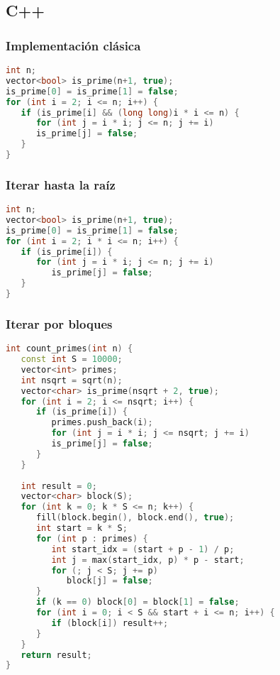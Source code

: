 \subsection{C++}

\subsubsection{Implementación clásica}
\begin{lstlisting}[language=C++]
int n;
vector<bool> is_prime(n+1, true);
is_prime[0] = is_prime[1] = false;
for (int i = 2; i <= n; i++) {
   if (is_prime[i] && (long long)i * i <= n) {
      for (int j = i * i; j <= n; j += i)
      is_prime[j] = false;
   }
}
\end{lstlisting}

\subsubsection{Iterar hasta la raíz}
\begin{lstlisting}[language=C++]
int n;
vector<bool> is_prime(n+1, true);
is_prime[0] = is_prime[1] = false;
for (int i = 2; i * i <= n; i++) {
   if (is_prime[i]) {
      for (int j = i * i; j <= n; j += i)
         is_prime[j] = false;
   }
}
\end{lstlisting}

\subsubsection{Iterar por bloques}
\begin{lstlisting}[language=C++]
int count_primes(int n) {
   const int S = 10000;
   vector<int> primes;
   int nsqrt = sqrt(n);
   vector<char> is_prime(nsqrt + 2, true);
   for (int i = 2; i <= nsqrt; i++) {
      if (is_prime[i]) {
         primes.push_back(i);
         for (int j = i * i; j <= nsqrt; j += i)
         is_prime[j] = false;
      }
   }
   
   int result = 0;
   vector<char> block(S);
   for (int k = 0; k * S <= n; k++) {
      fill(block.begin(), block.end(), true);
      int start = k * S;
      for (int p : primes) {
         int start_idx = (start + p - 1) / p;
         int j = max(start_idx, p) * p - start;
         for (; j < S; j += p)
            block[j] = false;
      }
      if (k == 0) block[0] = block[1] = false;
      for (int i = 0; i < S && start + i <= n; i++) {
         if (block[i]) result++;
      }
   }
   return result;
}
\end{lstlisting}

